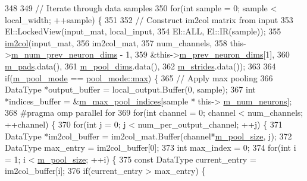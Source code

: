 \begin{DoxyCode}
348 
349     \textcolor{comment}{// Iterate through data samples}
350     \textcolor{keywordflow}{for}(\textcolor{keywordtype}{int} sample = 0; sample < local\_width; ++sample) \{
351 
352       \textcolor{comment}{// Construct im2col matrix from input}
353       El::LockedView(input\_mat, local\_input,
354                      El::ALL, El::IR(sample));
355       \hyperlink{namespacelbann_aa3636a1979e40da2af91f30a12b90db9}{im2col}(input\_mat,
356              im2col\_mat,
357              num\_channels,
358              this->\hyperlink{classlbann_1_1Layer_adc052afb38f170e839db00d3c8151d1e}{m\_num\_prev\_neuron\_dims} - 1,
359              &this->\hyperlink{classlbann_1_1Layer_ae204d1a2a79606eaa117273857ff62a3}{m\_prev\_neuron\_dims}[1],
360              \hyperlink{classlbann_1_1pooling__layer_a22fd39aa4358149110a369ddf0e5ffdb}{m\_pads}.data(),
361              \hyperlink{classlbann_1_1pooling__layer_abb52fe974f602921823a46320fd7d075}{m\_pool\_dims}.data(),
362              \hyperlink{classlbann_1_1pooling__layer_a754bb6d49b39e915f315ca0049c953d9}{m\_strides}.data());
363 
364       \textcolor{keywordflow}{if}(\hyperlink{classlbann_1_1pooling__layer_a7b19407c88f89757e64ed3d4afab8443}{m\_pool\_mode} == \hyperlink{base_8hpp_ac47a6ee5278a53898222a48639a2bf39a2ffe4e77325d9a7152f7086ea7aa5114}{pool\_mode::max}) \{
365         \textcolor{comment}{// Apply max pooling}
366         DataType *output\_buffer = local\_output.Buffer(0, sample);
367         \textcolor{keywordtype}{int} *indices\_buffer = &\hyperlink{classlbann_1_1pooling__layer_a58683798db4c48175cbad5ec32ff676c}{m\_max\_pool\_indices}[sample * this->
      \hyperlink{classlbann_1_1Layer_a6b5ebc8a7d9329d8a773ed787e7b41d8}{m\_num\_neurons}];
368 \textcolor{preprocessor}{        #pragma omp parallel for}
369         \textcolor{keywordflow}{for}(\textcolor{keywordtype}{int} channel = 0; channel < num\_channels; ++channel) \{
370           \textcolor{keywordflow}{for}(\textcolor{keywordtype}{int} j = 0; j < num\_per\_output\_channel; ++j) \{
371             DataType *im2col\_buffer = im2col\_mat.Buffer(channel*\hyperlink{classlbann_1_1pooling__layer_a8b3a9020bb896a1132c9823bc2c73515}{m\_pool\_size}, j);
372             DataType max\_entry = im2col\_buffer[0];
373             \textcolor{keywordtype}{int} max\_index = 0;
374             \textcolor{keywordflow}{for}(\textcolor{keywordtype}{int} i = 1; i < \hyperlink{classlbann_1_1pooling__layer_a8b3a9020bb896a1132c9823bc2c73515}{m\_pool\_size}; ++i) \{
375               \textcolor{keyword}{const} DataType current\_entry = im2col\_buffer[i];
376               \textcolor{keywordflow}{if}(current\_entry > max\_entry) \{

\end{DoxyCode}
